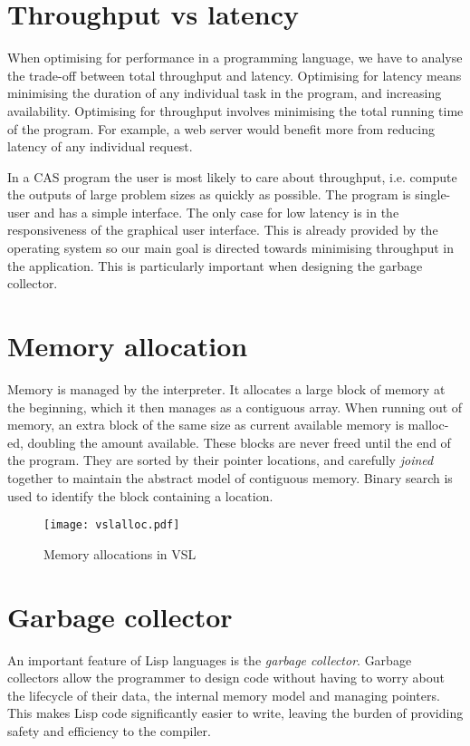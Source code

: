\section{Throughput vs latency}
When optimising for performance in a programming language, we have to analyse the trade-off between
total throughput and latency. Optimising for latency means minimising the duration of any individual
task in the program, and increasing availability. Optimising for throughput involves minimising the
total running time of the program. For example, a web server would benefit more from reducing latency
of any individual request.

In a CAS program the user is most likely to care about throughput, i.e. compute the outputs of large
problem sizes as quickly as possible. The program is single-user and has a simple interface. The only case
for low latency is in the responsiveness of the graphical user interface. This is already provided by the
operating system so our main goal is directed towards minimising throughput in the application.
This is particularly important when designing the garbage collector.

\section{Memory allocation}
Memory is managed by the interpreter. It allocates a large block of memory at the beginning,
which it then manages as a contiguous array. When running out of memory, an extra block of the
same size as current available memory is malloc-ed, doubling the amount available. These blocks are
never freed until the end of the program. They are sorted by their pointer locations,
and carefully \emph{joined} together to maintain the abstract model of contiguous memory. Binary search
is used to identify the block containing a location.


\begin{figure}[H]
    \centering
    \texttt{[image: vslalloc.pdf]}
    \label{fig:vslalloc}
    \caption{Memory allocations in VSL}
\end{figure}

\section{Garbage collector}
An important feature of Lisp languages is the \emph{garbage collector}. Garbage collectors allow the programmer
to design code without having to worry about the lifecycle of their data, the internal memory model and
managing pointers. This makes Lisp code significantly easier to write, leaving the burden of providing safety and
efficiency to the compiler.

